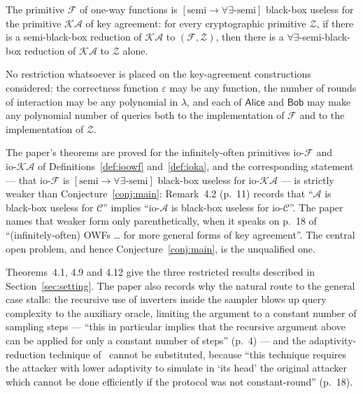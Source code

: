 \documentclass{conjura-conjecture}
\newcommand{\iopref}{\mathrm{io}\text{-}}
\newcommand{\Fc}{\mathcal{F}}
\newcommand{\KAc}{\mathcal{KA}}
\newcommand{\ioF}{\iopref\Fc}
\newcommand{\ioKA}{\iopref\KAc}
\newcommand{\Zc}{\mathcal{Z}}
\newcommand{\semibbu}{[\mathrm{semi}\to\forall\exists\text{-semi}]}
\newcommand{\Alice}{\mathsf{Alice}}
\newcommand{\Bob}{\mathsf{Bob}}
\begin{document}
\begin{conjecture}\label{conj:main}
The primitive $\Fc$ of one-way functions is $\semibbu$ black-box useless
for the primitive $\KAc$ of key agreement: for every cryptographic
primitive $\Zc$, if there is a semi-black-box reduction of $\KAc$ to
$(\Fc,\Zc)$, then there is a $\forall\exists$-semi-black-box reduction of
$\KAc$ to $\Zc$ alone.

No restriction whatsoever is placed on the key-agreement constructions
considered: the correctness function $\varepsilon$ may be any function,
the number of rounds of interaction may be any polynomial in $\lambda$,
and each of $\Alice$ and $\Bob$ may make any polynomial number of queries
both to the implementation of $\Fc$ and to the implementation of $\Zc$.
\end{conjecture}

\begin{remark}\label{rem:io}
The paper's theorems are proved for the infinitely-often primitives
$\ioF$ and $\ioKA$ of Definitions~\ref{def:ioowf} and~\ref{def:ioka}, and
the corresponding statement --- that $\ioF$ is $\semibbu$ black-box
useless for $\ioKA$ --- is strictly weaker than
Conjecture~\ref{conj:main}: Remark~4.2 (p.~11) records that
``$\mathcal A$ is black-box useless for $\mathcal C$'' implies
``$\iopref\mathcal A$ is black-box useless for $\iopref\mathcal C$''. The
paper names that weaker form only parenthetically, when it speaks on
p.~18 of ``(infinitely-often) OWFs \dots{} for more general forms of key
agreement''. The central open problem, and hence
Conjecture~\ref{conj:main}, is the unqualified one.
\end{remark}

\begin{remark}\label{rem:progress}
Theorems~4.1, 4.9 and 4.12 give the three restricted results described in
Section~\ref{sec:setting}. The paper also records why the natural route
to the general case stalls: the recursive use of inverters inside the
sampler blows up query complexity to the auxiliary oracle, limiting the
argument to a constant number of sampling steps --- ``this in particular
implies that the recursive argument above can be applied for only a
constant number of steps'' (p.~4) --- and the adaptivity-reduction
technique of~\cite{MMV11} cannot be substituted, because ``this technique
requires the attacker with lower adaptivity to simulate in `its head' the
original attacker which cannot be done efficiently if the protocol was
not constant-round'' (p.~18).
\end{remark}
\end{document}

